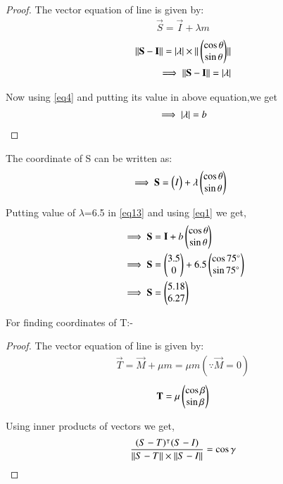 \documentclass[journal,12pt,twocolumn]{IEEEtran}
\begin{document}
\begin{enumerate}
\begin{proof}
The vector equation of line is given by:
\begin{align}
\vec{S}=\vec{I} + \lambda m \label{eq8}
\end{align}
\begin{align}
\Vert\mathbf{S}-\mathbf{I}\rVert = \vert\lambda\vert\times\Vert\begin{pmatrix}\cos \theta\\\sin \theta\end{pmatrix}\rVert 
\\
\implies \Vert\mathbf{S}-\mathbf{I}\rVert=\vert\lambda\vert
\end{align}
\item Now using \eqref{eq4} and putting its value in above equation,we get
\begin{align}
\implies \vert\lambda\vert=b \label{eq12}
\end{align}
\end{proof}
\begin{lemma}
\label{lemma}
The coordinate of S can be written as:
\begin{align}
&\implies \mathbf{S}=\begin{pmatrix}I\end{pmatrix} +\lambda \begin{pmatrix}\cos\theta \\\sin \theta \end{pmatrix} \label{eq13}
\end{align}
\end{lemma}
\item Putting value of $\lambda$=6.5 in \eqref{eq13} and using \eqref{eq1} we get,
\begin{align}
&\implies \mathbf{S}=\mathbf{I} +b\begin{pmatrix}\cos\theta \\\sin \theta \end{pmatrix}
\\
&\implies \mathbf{S}=\begin{pmatrix}3.5\\0\end{pmatrix} +6.5\begin{pmatrix}\cos 75 \degree\\\sin 75 \degree\end{pmatrix} 
\\
&\implies \mathbf{S}=\begin{pmatrix}5.18\\6.27\end{pmatrix}
\end{align}
\item For finding coordinates of T:-
\begin{proof}
The vector equation of line is given by:
\begin{align}
\vec{T}=\vec{M} + \mu m =\mu m (\because \vec{M}=0) 
\end{align}
\begin{align}
\mathbf{T}=\mu \begin{pmatrix}\cos \beta\\\sin \beta \end{pmatrix} \label{eq9}
\end{align}
\item Using inner products of vectors we get,
\begin{align}
\frac{(S-T)^\intercal(S-I)}{\norm{S-T}\times\norm{S-I}}=\cos\gamma \label{eq10}

\end{align}
\end{proof}
\end{enumerate}
\end{document}
